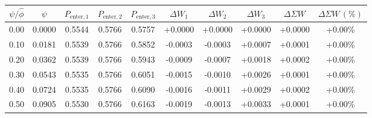 \begin{tabular}{cccccccccc}
\toprule
$\psi/\widehat{\phi}$ & $\psi$ &
$P_{\text{enter},1}$ & $P_{\text{enter},2}$ & $P_{\text{enter},3}$ &
$\Delta W_1$ & $\Delta W_2$ & $\Delta W_3$ &
$\Delta \Sigma W$ & $\Delta \Sigma W\,(\%)$ \\
\midrule
0.00 & 0.0000 & 0.5544 & 0.5766 & 0.5757 & +0.0000 & +0.0000 & +0.0000 & +0.0000 & +0.00\% \\
0.10 & 0.0181 & 0.5539 & 0.5766 & 0.5852 & -0.0003 & -0.0003 & +0.0007 & +0.0001 & +0.00\% \\
0.20 & 0.0362 & 0.5539 & 0.5766 & 0.5943 & -0.0009 & -0.0007 & +0.0018 & +0.0002 & +0.00\% \\
0.30 & 0.0543 & 0.5535 & 0.5766 & 0.6051 & -0.0015 & -0.0010 & +0.0026 & +0.0001 & +0.00\% \\
0.40 & 0.0724 & 0.5535 & 0.5766 & 0.6090 & -0.0016 & -0.0011 & +0.0029 & +0.0002 & +0.00\% \\
0.50 & 0.0905 & 0.5530 & 0.5766 & 0.6163 & -0.0019 & -0.0013 & +0.0033 & +0.0001 & +0.00\% \\
\bottomrule
\end{tabular}
